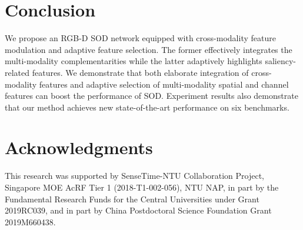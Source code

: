 \documentclass[runningheads]{llncs}
\begin{document}
\section{Conclusion}

We propose an RGB-D SOD network equipped with cross-modality feature modulation and adaptive feature selection.
The former effectively integrates the multi-modality complementarities while the latter adaptively highlights saliency-related features.
We demonstrate that both elaborate integration of cross-modality features  and adaptive selection of multi-modality spatial and channel features can boost the performance of SOD. Experiment results also demonstrate that our method achieves new state-of-the-art performance on six benchmarks.

\section*{Acknowledgments}
This research was supported by SenseTime-NTU Collaboration Project, Singapore MOE AcRF Tier 1 (2018-T1-002-056), NTU NAP, in part by the Fundamental Research Funds for the Central Universities under Grant 2019RC039, and in part by China Postdoctoral Science Foundation Grant 2019M660438.



\end{document}
